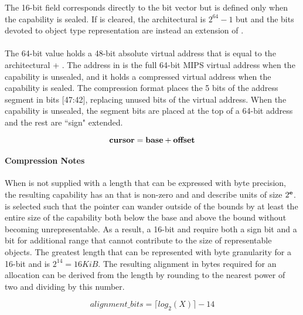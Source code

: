 The 16-bit \cotype{} field corresponds directly to the \cotype{} bit vector but is defined only when the capability is sealed.
If \csealed{} is cleared, the architectural \cotype{} is $2^{64}-1$
but and the bits devoted to object type representation are instead an extension of \ccursor{}.

\paragraph{\ccursor{}}

The 64-bit \ccursor{} value holds a 48-bit absolute virtual address that is equal to the architectural \cbase{} + \coffset{}.
The address in \ccursor{} is the full 64-bit MIPS virtual address when the capability is unsealed,
and it holds a compressed virtual address when the capability is sealed.
The compression format places the 5 bits of the address segment in bits [47:42], replacing unused bits of the virtual address.
When the capability is unsealed, the segment bits are placed at the top of a 64-bit address and the rest are ``sign" extended.

\begin{equation*}
{\bf cursor}{} = {\bf base}{} + {\bf offset}{}
\end{equation*}

\paragraph{Compression Notes}
When  is not supplied with a length that can be expressed with byte precision, the resulting capability has an \cexponent{} that is non-zero and \ctobase{} and \ctobound{} describe units of size $2^{\bf e}{}$.
\cexponent{} is selected such that the pointer can wander outside of the bounds by at least the entire size of the capability both below the base and above the bound without becoming unrepresentable.
As a result, a 16-bit \ctobase{} and \ctobound{} require both a sign bit and a bit for additional range that cannot contribute to the size of representable objects.
The greatest length that can be represented with byte granularity for a 16-bit \ctobase{} and \ctobound{} is $2^{14}=16KiB$.
The resulting alignment in bytes required for an allocation can be derived from the length by rounding to the nearest power of two and dividing by this number.

\begin{equation*}
alignment\_bits = \lceil log_2(X) \rceil - 14
\end{equation*}

